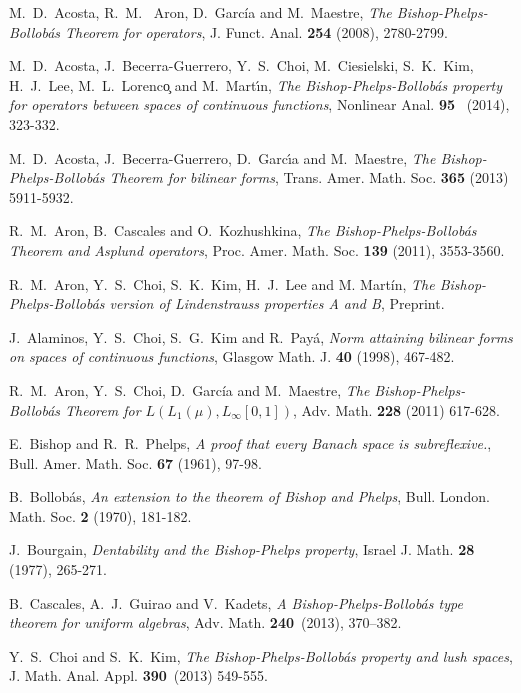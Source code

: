 \documentclass[a4paper]{amsart}
\theoremstyle{plain}
\theoremstyle{definition}
\begin{document}
\begin{thebibliography}{99}

 M.~D.~Acosta, R.~M.~ Aron, D.~Garc\'ia and M.~Maestre, \emph{The Bishop-Phelps-Bollob\'as Theorem for operators}, J. Funct. Anal. {\bf 254} (2008), 2780-2799.

M.~D.~Acosta, J.~Becerra-Guerrero, Y.~S.~Choi, M.~Ciesielski, S.~K.~Kim, H.~J.~Lee, M.~L.~Lorenc\c{o} and M.~Mart\'{\i}n, \emph{The Bishop-Phelps-Bollob\'{a}s property for operators between spaces of continuous functions}, Nonlinear Anal. {\bf 95}~ (2014), 323-332.

M.~D.~Acosta, J.~Becerra-Guerrero, D.~Garc\'{\i}a and M.~Maestre, \emph{The Bishop-Phelps-Bollob\'{a}s Theorem for bilinear forms},  Trans. Amer. Math. Soc. {\bf 365} (2013) 5911-5932.

 R.~M.~Aron, B.~Cascales and O.~Kozhushkina, \emph{The Bishop-Phelps-Bollob\'as Theorem and Asplund operators}, Proc. Amer. Math. Soc. {\bf 139} (2011), 3553-3560.

 R.~M.~Aron, Y.~S.~Choi, S.~K.~Kim, H.~J.~Lee and M. Mart\'in, \emph{The Bishop-Phelps-Bollob\'{a}s version of Lindenstrauss properties A and B}, Preprint.

  J.~Alaminos, Y.~S.~Choi, S.~G.~Kim and R.~Pay\'a, \emph{Norm attaining bilinear forms on spaces of continuous functions}, Glasgow Math. J. {\bf 40} (1998), 467-482.

 R.~M.~Aron, Y.~S.~Choi, D.~Garc\'ia and M.~Maestre, \emph{The Bishop-Phelps-Bollob\'as Theorem for $L(L_1(\mu),L_\infty[0,1])$}, Adv. Math. {\bf 228} (2011) 617-628.

 E.~Bishop and R.~R.~Phelps, \emph{A proof that every Banach space is subreflexive.}, Bull. Amer. Math. Soc. {\bf 67} (1961), 97-98.

 B.~Bollob\'as, \emph{An extension to the theorem of Bishop and Phelps}, Bull. London. Math. Soc. {\bf 2} (1970), 181-182.

 J.~Bourgain, \emph{Dentability and the Bishop-Phelps property}, Israel J. Math. {\bf 28} (1977), 265-271.

B.~Cascales, A.~J.~Guirao and V.~Kadets, \emph{A Bishop-Phelps-Bollob\'{a}s type theorem for uniform algebras}, {Adv. Math.} \textbf{240}~(2013), 370--382.

 Y.~S.~Choi and S.~K.~Kim, \emph{The Bishop-Phelps-Bollob\'as property and lush spaces}, J. Math. Anal. Appl. {\bf 390}~(2013) 549-555.


\end{thebibliography}
\end{document}
